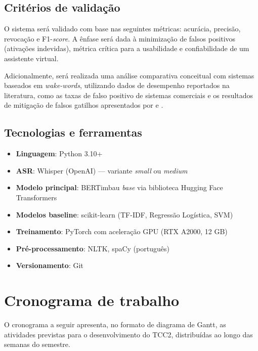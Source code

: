 \documentclass[
    12pt,                %
    openright,           %
    oneside,             %
    a4paper,             %
    english,             %
    brazil               %
]{abntex2}
\begin{document}
\subsection{Critérios de validação}

O sistema será validado com base nas seguintes métricas: acurácia, precisão, revocação e F1-\textit{score}. A ênfase será dada à minimização de falsos positivos (ativações indevidas), métrica crítica para a usabilidade e confiabilidade de um assistente virtual.

Adicionalmente, será realizada uma análise comparativa conceitual com sistemas baseados em \textit{wake-words}, utilizando dados de desempenho reportados na literatura, como as taxas de falso positivo de sistemas comerciais e os resultados de mitigação de falsos gatilhos apresentados por  e .

\subsection{Tecnologias e ferramentas}

\begin{itemize}
    \item \textbf{Linguagem}: Python 3.10+
    \item \textbf{ASR}: Whisper (OpenAI) --- variante \textit{small} ou \textit{medium}
    \item \textbf{Modelo principal}: BERTimbau \textit{base} \cite{Souza2020} via biblioteca Hugging Face Transformers
    \item \textbf{Modelos baseline}: scikit-learn (TF-IDF, Regressão Logística, SVM)
    \item \textbf{Treinamento}: PyTorch com aceleração GPU (RTX A2000, 12 GB)
    \item \textbf{Pré-processamento}: NLTK, spaCy (português)
    \item \textbf{Versionamento}: Git
\end{itemize}

\section{Cronograma de trabalho}
\label{sec:cronograma}

O cronograma a seguir apresenta, no formato de diagrama de Gantt, as atividades previstas para o desenvolvimento do TCC2, distribuídas ao longo das semanas do semestre.
\end{document}
